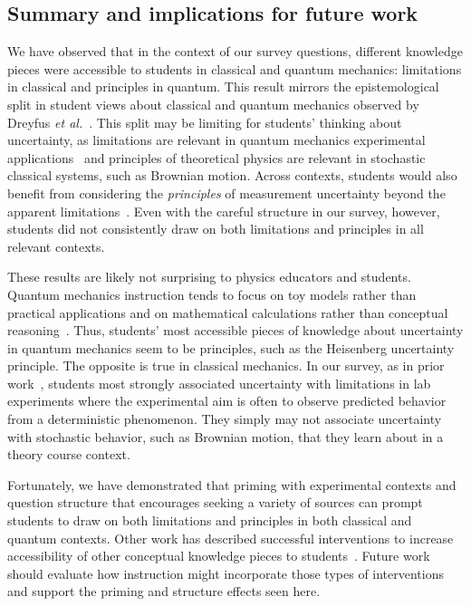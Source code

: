 \documentclass[english,aps,prstper,reprint,showpacs,longbibliography,superscriptaddress,nofootinbib]{revtex4-2}
\begin{document}
\subsection{Summary and implications for future work}

We have observed that in the context of our survey questions, different knowledge pieces were accessible to students in classical and quantum mechanics: limitations in classical and principles in quantum. This result mirrors the epistemological split in student views about classical and quantum mechanics observed by Dreyfus \textit{et al.}~\cite{Dreyfus2019}. This split may be limiting for students' thinking about uncertainty, as limitations are relevant in quantum mechanics experimental applications~\cite{Fox2020} and principles of theoretical physics are relevant in stochastic classical systems, such as Brownian motion. Across contexts, students would also benefit from considering the \emph{principles} of measurement uncertainty beyond the apparent limitations~\cite{Evangelinos1999,Evangelinos2002,Allie2003,Pillay2008,Buffler2008}. Even with the careful structure in our survey, however, students did not consistently draw on both limitations and  principles in all relevant contexts.

These results are likely not surprising to physics educators and students. Quantum mechanics instruction tends to focus on toy models rather than practical applications and on mathematical calculations rather than conceptual reasoning~\cite{Johansson2018}. Thus, students' most accessible pieces of knowledge about uncertainty in quantum mechanics seem to be principles, such as the Heisenberg uncertainty principle. %
The opposite is true in classical mechanics. In our survey, as in prior work~\cite{Sere1993,Holmes2015}, students most strongly associated uncertainty with limitations in lab experiments where the experimental aim is often to observe predicted behavior from a deterministic phenomenon. They simply may not associate uncertainty with stochastic behavior, such as Brownian motion, that they learn about in a theory course context.

Fortunately, we have demonstrated that priming with experimental contexts and question structure that encourages seeking a variety of sources can prompt students to draw on both limitations and principles in both classical and quantum contexts. %
Other work has described successful interventions to increase accessibility of other conceptual knowledge pieces to students~\cite[e.g.,][]{Gette2018}. Future work should evaluate how instruction might incorporate those types of interventions and support the priming and structure effects seen here. %
\end{document}
